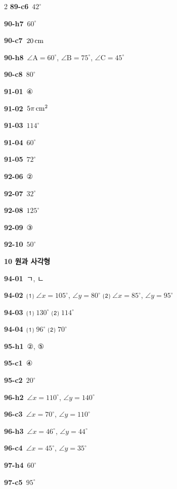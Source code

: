 \documentclass[10pt,a4paper]{article}
\newcommand{\pt}[1]{\mathrm{#1}}
\begin{document}
\begin{multicols}{2}
\noindent\textbf{89-c6}\ $42^\circ$\par
\noindent\textbf{90-h7}\ $60^\circ$\par
\noindent\textbf{90-c7}\ $20\mkern3mu \mathrm{cm}$\par
\noindent\textbf{90-h8}\ $\angle\pt{A}=60^\circ$, $\angle\pt{B}=75^\circ$, $\angle\pt{C}=45^\circ$\par
\noindent\textbf{90-c8}\ $80^\circ$\par
\noindent\textbf{91-01}\ ④\par
\noindent\textbf{91-02}\ $5\pi\mkern3mu \mathrm{cm}^2$\par
\noindent\textbf{91-03}\ $114^\circ$\par
\noindent\textbf{91-04}\ $60^\circ$\par
\noindent\textbf{91-05}\ $72^\circ$\par
\noindent\textbf{92-06}\ ②\par
\noindent\textbf{92-07}\ $32^\circ$\par
\noindent\textbf{92-08}\ $125^\circ$\par
\noindent\textbf{92-09}\ ③\par
\noindent\textbf{92-10}\ $50^\circ$\par
\noindent\textbf{10 원과 사각형}\par\smallskip
\noindent\textbf{94-01}\ ㄱ, ㄴ\par
\noindent\textbf{94-02}\ ⑴ $\angle x=105^\circ$, $\angle y=80^\circ$ ⑵ $\angle x=85^\circ$, $\angle y=95^\circ$\par
\noindent\textbf{94-03}\ ⑴ $130^\circ$ ⑵ $114^\circ$\par
\noindent\textbf{94-04}\ ⑴ $96^\circ$ ⑵ $70^\circ$\par
\noindent\textbf{95-h1}\ ②, ⑤\par
\noindent\textbf{95-c1}\ ④\par
\noindent\textbf{95-c2}\ $20^\circ$\par
\noindent\textbf{96-h2}\ $\angle x=110^\circ$, $\angle y=140^\circ$\par
\noindent\textbf{96-c3}\ $\angle x=70^\circ$, $\angle y=110^\circ$\par
\noindent\textbf{96-h3}\ $\angle x=46^\circ$, $\angle y=44^\circ$\par
\noindent\textbf{96-c4}\ $\angle x=45^\circ$, $\angle y=35^\circ$\par
\noindent\textbf{97-h4}\ $60^\circ$\par
\noindent\textbf{97-c5}\ $95^\circ$\par

\end{multicols}
\end{document}
